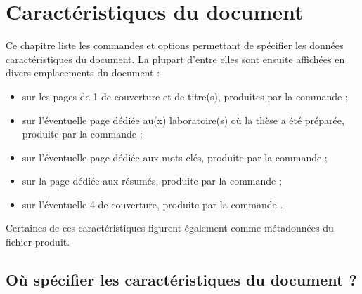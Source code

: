 \chapter{Caractéristiques du document}
\label{cha-caract-du-docum}

Ce chapitre liste les commandes et options permettant de spécifier les données
caractéristiques du document. La plupart d'entre elles sont ensuite affichées
en divers emplacements du document :
\begin{itemize}
\item sur les pages de 1\iere{} de couverture et de titre(s), produites par la
  commande  ;
\item sur l'éventuelle page dédiée au(x) laboratoire(s) où la thèse a été préparée,
  produite par la commande  ;
\item sur l'éventuelle page dédiée aux mots clés, produite par la commande  ;
\item sur la page dédiée aux résumés, produite par la commande  ;
\item sur l'éventuelle 4\ieme{} de couverture, produite par la commande
  .
\end{itemize}
Certaines de ces caractéristiques figurent également comme métadonnées du fichier
\pdf produit.

\section{Où spécifier les caractéristiques du document ?}
\label{sec-lieu-de-saisie}

